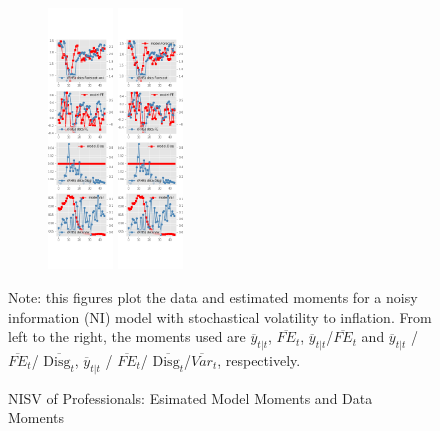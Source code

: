 \documentclass[]{article}
\begin{document}
\begin{figure}[ht]
\begin{subfigure}[b]{\textwidth}
		\includegraphics[width=0.19\textwidth]{figures/spf_ni_est_sv_diag3.png}
		\includegraphics[width=0.19\textwidth]{figures/spf_ni_est_sv_diag4.png}
	\end{subfigure}
	\begin{flushleft}
		{\footnotesize Note: this figures plot the data and estimated moments for a noisy information (NI) model  with stochastical volatility to inflation. From left to the right, the moments used are $\overline y_{t|t}$, $\overline{FE}_{t}$, $\overline y_{t|t}$/$\overline{FE}_{t}$ and $\overline y_{t|t}$ / $\overline{FE}_{t}$/ $\overline{\textrm{Disg}_t}$, $\overline y_{t|t}$ / $\overline{FE}_{t}$/ $\overline{\textrm{Disg}_t}$/$\overline{Var}_t$,  respectively. }
	\end{flushleft}
	\caption{NISV of Professionals: Esimated Model Moments and Data Moments}
\end{figure}
\end{document}
